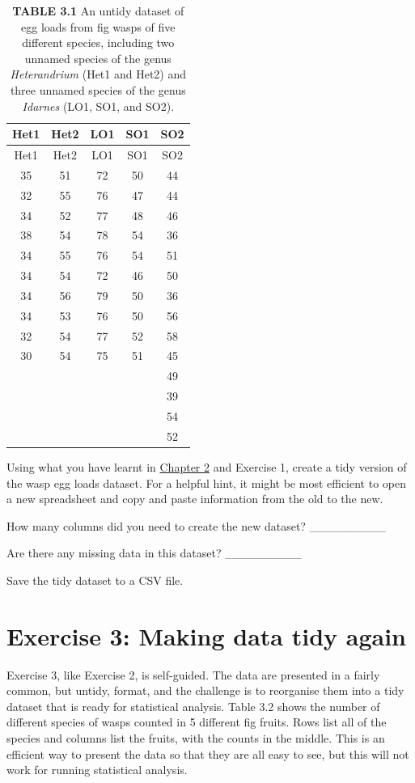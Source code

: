 \documentclass[
  openany]{krantz}
\begin{document}
\begin{longtable}[]{@{}ccccc@{}}
\caption{\textbf{TABLE 3.1} An untidy dataset of egg loads from fig wasps of five different species, including two unnamed species of the genus \emph{Heterandrium} (Het1 and Het2) and three unnamed species of the genus \emph{Idarnes} (LO1, SO1, and SO2).}\tabularnewline
\toprule
Het1 & Het2 & LO1 & SO1 & SO2 \\
\midrule
\endfirsthead
\toprule
Het1 & Het2 & LO1 & SO1 & SO2 \\
\midrule
\endhead
35 & 51 & 72 & 50 & 44 \\
32 & 55 & 76 & 47 & 44 \\
34 & 52 & 77 & 48 & 46 \\
38 & 54 & 78 & 54 & 36 \\
34 & 55 & 76 & 54 & 51 \\
34 & 54 & 72 & 46 & 50 \\
34 & 56 & 79 & 50 & 36 \\
34 & 53 & 76 & 50 & 56 \\
32 & 54 & 77 & 52 & 58 \\
30 & 54 & 75 & 51 & 45 \\
& & & & 49 \\
& & & & 39 \\
& & & & 54 \\
& & & & 52 \\
\bottomrule
\end{longtable}

Using what you have learnt in \protect\hyperlink{Chapter_2}{Chapter 2} and Exercise 1, create a tidy version of the wasp egg loads dataset.
For a helpful hint, it might be most efficient to open a new spreadsheet and copy and paste information from the old to the new.

How many columns did you need to create the new dataset? \_\_\_\_\_\_\_\_\_

Are there any missing data in this dataset? \_\_\_\_\_\_\_\_\_

Save the tidy dataset to a CSV file.

\hypertarget{exercise-3-making-data-tidy-again}{%
\section{Exercise 3: Making data tidy again}\label{exercise-3-making-data-tidy-again}}

Exercise 3, like Exercise 2, is self-guided.
The data are presented in a fairly common, but untidy, format, and the challenge is to reorganise them into a tidy dataset that is ready for statistical analysis.
Table 3.2 shows the number of different species of wasps counted in 5 different fig fruits.
Rows list all of the species and columns list the fruits, with the counts in the middle.
This is an efficient way to present the data so that they are all easy to see, but this will not work for running statistical analysis.
\end{document}
